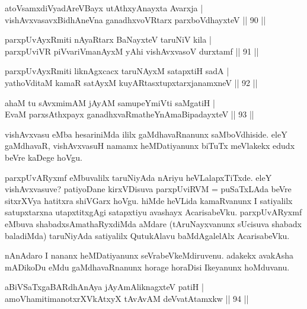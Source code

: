 \begin{shl}
atoV\s samxdiVyadAreVBayx utAthxyAnayxta Avarxja | \\
vishAvxvasavxBidhAneVna ganadhxvoVR\s tarx parxboVdhayxteV \hfill|| 90 || 
\end{shl}

\begin{shl}
parxpUvAyxRmiti nAyaRtarx BaNayxteV taruNiV kila | \\
parxpUviVR piVvariVmanAyxM yAhi vishAvxvasoV durxtamf \hfill|| 91 || 
\end{shl}

\begin{shl}
parxpUvAyxRmiti liknAgxcacx taruNAyxM satapxtiH sadA | \\
yathoVditaM kamaR satAyxM kuyARtasxtupxtarxjanamxneV \hfill|| 92 || 
\end{shl}

\begin{shl}
ahaM tu sAvxmimAM jAyAM samupeYmiVti saMgatiH | \\
EvaM parxsAthxpayx ganadhxvaRmatheYnAmaBipadayxteV \hfill|| 93 || 
\end{shl}

\begin{artha}
vishAvxvasu eMba hesariniMda ililx gaMdhavaRnanunx saMboVdhiside. eleY 
gaMdhavaR, vishAvxvasuH namamx heMDatiyanunx biTuTx meVlakekx edudx 
beVre kaDege hoVgu.
\end{artha}

\begin{artha}
parxpUvARyxmf eMbuvalilx taruNiyAda nAriyu heVLalapxTiTxde. eleY 
vishAvxvasuve? patiyoDane kirxVDisuva parxpUviRVM = puSaTxLAda beVre 
sitxrXVya hatitxra shiVGarx hoVgu. hiMde heVLida kamaRvanunx I 
satiyalilx satupxtarxna utapxtitxgAgi satapxtiyu avashayx 
AcarisabeVku. parxpUvARyxmf eMbuva shabadxsAmathaRyxdiMda aMdare 
(tAruNayxvanunx sUcisuva shabadx baladiMda) taruNiyAda satiyalilx 
QutukAlavu baMdAgalelAlx AcarisabeVku.
\end{artha}

\begin{artha}
nAnAdaro I nananx heMDatiyanunx seVrabeVkeMdiruvenu. adakekx avakAsha 
mADikoDu eMdu gaMdhavaRnanunx horage horaDisi Ikeyanunx hoMduvanu.
\end{artha}

\begin{shl}
aBiVSaTxgaBARdhAnAya jAyAmAliknagxteV patiH | \\
amoV\s hamitimanotxrXVkAtxyX tAvAvAM deVvatAtamxkw \hfill|| 94 || 
\end{shl}

